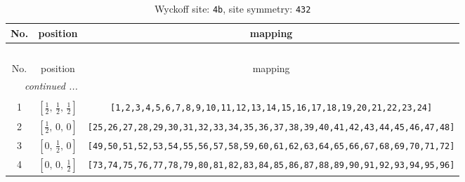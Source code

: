 \documentclass[fleqn,8pt]{jsarticle}
\begin{document}
\begin{longtable}{ccc}
\caption{Wyckoff site: {\tt 4b}, site symmetry: {\tt 432}}
 \\
 \hline \hline
No. & position & mapping \\ \hline \endfirsthead

\multicolumn{2}{l}{\tablename\ \thetable{}} \\
 \hline \hline
No. & position & mapping \\ \hline \endhead

 \hline \hline
\multicolumn{2}{r}{\footnotesize\it continued ...} \\ \endfoot

 \hline \hline
\multicolumn{2}{r}{} \\ \endlastfoot

1 & $\left[ \frac{1}{2},\, \frac{1}{2},\, \frac{1}{2} \right]$ & {\tt [1,2,3,4,5,6,7,8,9,10,11,12,13,14,15,16,17,18,19,20,21,22,23,24]} \\ \hline
2 & $\left[ \frac{1}{2},\, 0,\, 0 \right]$ & {\tt [25,26,27,28,29,30,31,32,33,34,35,36,37,38,39,40,41,42,43,44,45,46,47,48]} \\ \hline
3 & $\left[ 0,\, \frac{1}{2},\, 0 \right]$ & {\tt [49,50,51,52,53,54,55,56,57,58,59,60,61,62,63,64,65,66,67,68,69,70,71,72]} \\ \hline
4 & $\left[ 0,\, 0,\, \frac{1}{2} \right]$ & {\tt [73,74,75,76,77,78,79,80,81,82,83,84,85,86,87,88,89,90,91,92,93,94,95,96]} \\
\end{longtable}
\renewcommand{\arraystretch}{1.2}
\end{document}
